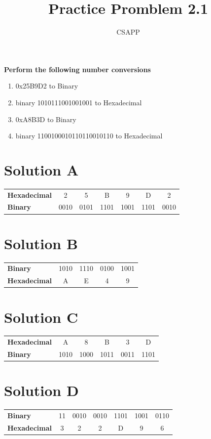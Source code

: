 \documentclass{article}
\title{Practice Promblem 2.1}
\author{CSAPP}
\begin{document}
    \maketitle
   
     \textbf{Perform the following number conversions}
     \vspace{0.8em}
     \begin{enumerate}[label=(\Alph*)]
        \item 0x25B9D2 to Binary
        \item binary 1010111001001001 to Hexadecimal
        \item 0xA8B3D to Binary
        \item binary 1100100010110110010110 to Hexadecimal
     \end{enumerate}
     
     \section*{\small Solution A}
     \vspace{0.2em}
     \small
     \begin{tabular}{l|cccccc}
        \toprule
        \textbf{Hexadecimal} & 2 & 5 & B & 9 & D & 2 \\
        \textbf{Binary}      &0010 & 0101 & 1101 & 1001 & 1101 & 0010\\
        \bottomrule
     \end{tabular}

     \section*{\small Solution B}
     \vspace{0.2em}
     \begin{tabular}{l|cccc}
        \toprule
        \textbf{Binary} & 1010 & 1110 & 0100 & 1001 \\
        \textbf{Hexadecimal} & A & E & 4 & 9 \\
        \bottomrule
     \end{tabular}

     \section*{\small Solution C}
     \vspace{0.2em}
     \begin{tabular}{l|ccccc}
        \toprule
        \textbf{Hexadecimal} & A & 8 & B & 3 & D \\
        \textbf{Binary} & 1010 & 1000 & 1011 & 0011 & 1101\\
        \bottomrule
     \end{tabular}

     \section*{\small Solution D}
     \vspace{0.2em}
        \begin{tabular}{l|cccccc}
            \toprule
            \textbf{Binary} & 11 & 0010 & 0010 & 1101 & 1001 & 0110 \\
            \textbf{Hexadecimal} & 3 & 2 & 2 & D & 9 & 6 \\
            \bottomrule
        \end{tabular}
\end{document}
